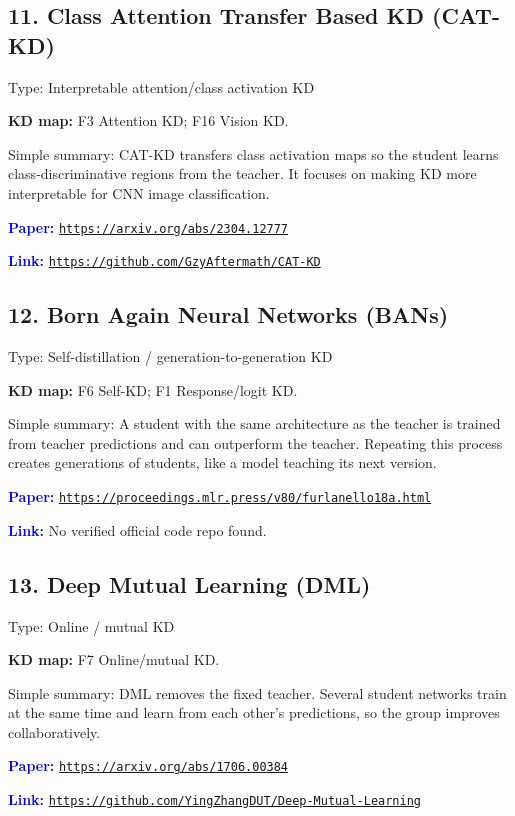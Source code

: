 \documentclass[10pt]{article}
\begin{document}
\subsection*{11. Class Attention Transfer Based KD (CAT-KD)}
Type: Interpretable attention/class activation KD\par
\textbf{KD map:} F3 Attention KD; F16 Vision KD.\par
Simple summary: CAT-KD transfers class activation maps so the student learns class-discriminative regions from the teacher. It focuses on making KD more interpretable for CNN image classification.\par
\textcolor{blue}{\textbf{Paper:}} \href{https://arxiv.org/abs/2304.12777}{\nolinkurl{https://arxiv.org/abs/2304.12777}}\par
\textcolor{blue}{\textbf{Link:}} \href{https://github.com/GzyAftermath/CAT-KD}{\nolinkurl{https://github.com/GzyAftermath/CAT-KD}}\par

\subsection*{12. Born Again Neural Networks (BANs)}
Type: Self-distillation / generation-to-generation KD\par
\textbf{KD map:} F6 Self-KD; F1 Response/logit KD.\par
Simple summary: A student with the same architecture as the teacher is trained from teacher predictions and can outperform the teacher. Repeating this process creates generations of students, like a model teaching its next version.\par
\textcolor{blue}{\textbf{Paper:}} \href{https://proceedings.mlr.press/v80/furlanello18a.html}{\nolinkurl{https://proceedings.mlr.press/v80/furlanello18a.html}}\par
\textcolor{blue}{\textbf{Link:}} No verified official code repo found.\par

\subsection*{13. Deep Mutual Learning (DML)}
Type: Online / mutual KD\par
\textbf{KD map:} F7 Online/mutual KD.\par
Simple summary: DML removes the fixed teacher. Several student networks train at the same time and learn from each other's predictions, so the group improves collaboratively.\par
\textcolor{blue}{\textbf{Paper:}} \href{https://arxiv.org/abs/1706.00384}{\nolinkurl{https://arxiv.org/abs/1706.00384}}\par
\textcolor{blue}{\textbf{Link:}} \href{https://github.com/YingZhangDUT/Deep-Mutual-Learning}{\nolinkurl{https://github.com/YingZhangDUT/Deep-Mutual-Learning}}\par
\end{document}
